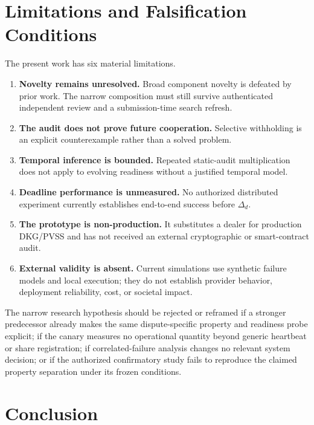 \documentclass[10pt]{article}
\begin{document}
\section{Limitations and Falsification Conditions}

The present work has six material limitations.

\begin{enumerate}
  \item \textbf{Novelty remains unresolved.} Broad component novelty is defeated by prior work. The narrow composition must still survive authenticated independent review and a submission-time search refresh.
  \item \textbf{The audit does not prove future cooperation.} Selective withholding is an explicit counterexample rather than a solved problem.
  \item \textbf{Temporal inference is bounded.} Repeated static-audit multiplication does not apply to evolving readiness without a justified temporal model.
  \item \textbf{Deadline performance is unmeasured.} No authorized distributed experiment currently establishes end-to-end success before $\Delta_d$.
  \item \textbf{The prototype is non-production.} It substitutes a dealer for production DKG/PVSS and has not received an external cryptographic or smart-contract audit.
  \item \textbf{External validity is absent.} Current simulations use synthetic failure models and local execution; they do not establish provider behavior, deployment reliability, cost, or societal impact.
\end{enumerate}

The narrow research hypothesis should be rejected or reframed if a stronger predecessor already makes the same dispute-specific property and readiness probe explicit; if the canary measures no operational quantity beyond generic heartbeat or share registration; if correlated-failure analysis changes no relevant system decision; or if the authorized confirmatory study fails to reproduce the claimed property separation under its frozen conditions.

\section{Conclusion}
\end{document}
